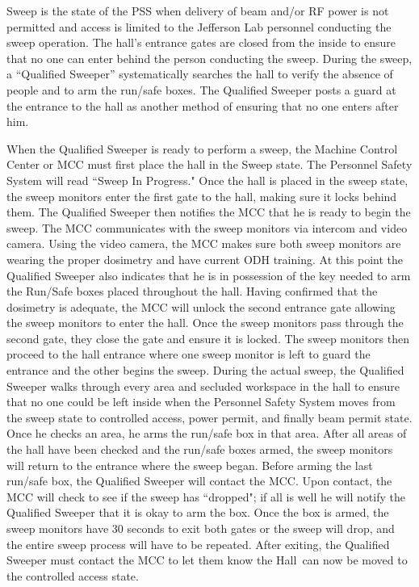 Sweep is the state of the PSS when delivery of beam and/or RF power is
not permitted and access is limited to the Jefferson Lab personnel
conducting the sweep operation.  The hall's entrance gates are closed
from the inside to ensure that no one can enter behind the person
conducting the sweep. During the sweep, a ``Qualified Sweeper''\cite{PSScebaf}
systematically searches the hall to verify the absence of
people and to arm the run/safe boxes. The Qualified Sweeper posts a guard at the
entrance to the hall as another method of ensuring that no one enters
after him.
 
When the Qualified Sweeper is ready to perform a sweep, the
Machine Control Center or MCC must first place the hall in the Sweep
state. The Personnel Safety System will read ``Sweep In Progress."
Once the hall is placed in the sweep state, the sweep monitors enter
the first gate to the hall, making sure it locks behind them. The Qualified Sweeper
then notifies the MCC that he is ready to begin the sweep. The MCC
communicates with the sweep monitors via intercom and video
camera. Using the video camera, the MCC makes sure both sweep monitors
are wearing the proper dosimetry and have current ODH training. 
At this point the Qualified Sweeper also indicates
that he is in possession of the key needed to arm the Run/Safe boxes
placed throughout the hall.  Having confirmed that the dosimetry is
adequate, the MCC will unlock the second entrance gate allowing the
sweep monitors to enter the hall. Once the sweep monitors pass through
the second gate, they close the gate and ensure it is locked. The
sweep monitors then proceed to the hall entrance where one sweep
monitor is left to guard the entrance and the other begins the sweep.
During the actual sweep, the Qualified Sweeper walks through every area and secluded
workspace in the hall to ensure that no one could be left inside when
the Personnel Safety System moves from the sweep state to controlled
access, power permit, and finally beam permit state. Once he checks an
area, he arms the run/safe box in that area.  After all areas of the
hall have been checked and the run/safe boxes armed, the sweep
monitors will return to the entrance where the sweep began. Before
arming the last run/safe box, the Qualified Sweeper will contact the MCC. Upon
contact, the MCC will check to see if the sweep has ``dropped"; if all
is well he will notify the Qualified Sweeper that it is okay to arm the box. Once
the box is armed, the sweep monitors have 30 seconds to exit both
gates or the sweep will drop, and the entire sweep process will have
to be repeated. After exiting, the Qualified Sweeper must contact the MCC to let
them know the Hall~can now be moved to the controlled access state.
 
